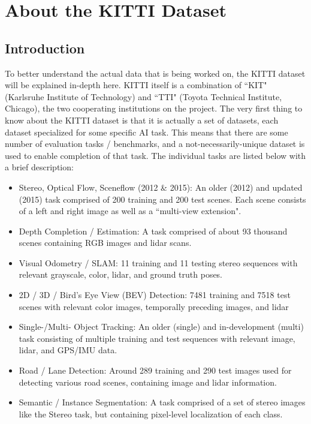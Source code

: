 \newpage
\section{About the KITTI Dataset}
\label{appendix_kitti}

\subsection{Introduction}
To better understand the actual data that is being worked on, the KITTI dataset will be explained in-depth here. KITTI itself is a combination of ``KIT" (Karlsruhe Institute of Technology) and ``TTI" (Toyota Technical Institute, Chicago), the two cooperating institutions on the project. The very first thing to know about the KITTI dataset is that it is actually a set of datasets, each dataset specialized for some specific AI task. This means that there are some number of evaluation tasks / benchmarks, and a not-necessarily-unique dataset is used to enable completion of that task. The individual tasks are listed below with a brief description: 

\begin{itemize}\itemsep=-0.5em 
    \item Stereo, Optical Flow, Sceneflow (2012 \& 2015): An older (2012) and updated (2015) task comprised of 200 training and 200 test scenes. Each scene consists of a left and right image as well as a ``multi-view extension".
    \item Depth Completion / Estimation: A task comprised of about 93 thousand scenes containing RGB images and lidar scans.
    \item Visual Odometry / SLAM: 11 training and 11 testing stereo sequences with relevant grayscale, color, lidar, and ground truth poses.
    \item 2D / 3D / Bird's Eye View (BEV) Detection: 7481 training and 7518 test scenes with relevant color images, temporally preceding images, and lidar
    \item Single-/Multi- Object Tracking: An older (single) and in-development (multi) task consisting of multiple training and test sequences with relevant image, lidar, and GPS/IMU data. 
    \item Road / Lane Detection: Around 289 training and 290 test images used for detecting various road scenes, containing image and lidar information.
    \item Semantic / Instance Segmentation: A task comprised of a set of stereo images like the Stereo task, but containing pixel-level localization of each class. 
\end{itemize}

